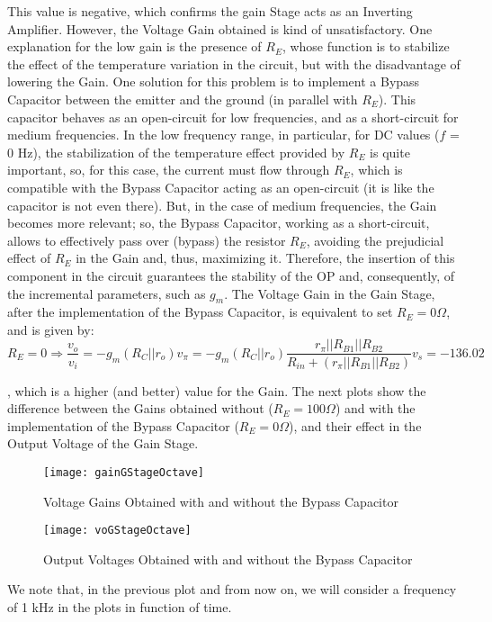 This value is negative, which confirms the gain Stage acts as an Inverting Amplifier.
However, the Voltage Gain obtained is kind of unsatisfactory. One explanation for the low gain is the presence of $R_E$, whose function is to stabilize the effect of the temperature variation in the circuit, but with the disadvantage of lowering the Gain. One solution for this problem is to implement a Bypass Capacitor between the emitter and the ground (in parallel with $R_E$). This capacitor behaves as an open-circuit for low frequencies, and as a short-circuit for medium frequencies. In the low frequency range, in particular, for DC values ($f$ = 0 Hz), the stabilization of the temperature effect provided by $R_E$ is quite important, so, for this case, the current must flow through $R_E$, which is compatible with the Bypass Capacitor acting as an open-circuit (it is like the capacitor is not even there). But, in the case of medium frequencies, the Gain becomes more relevant; so, the Bypass Capacitor, working as a short-circuit, allows to effectively pass over (bypass) the resistor $R_E$, avoiding the prejudicial effect of $R_E$ in the Gain and, thus, maximizing it. 
Therefore, the insertion of this component in the circuit guarantees the stability of the OP and, consequently, of the incremental parameters, such as $g_m$.
The Voltage Gain in the Gain Stage, after the implementation of the Bypass Capacitor, is equivalent to set $R_E = 0 \Omega$, and is given by:
\begin{equation}
	R_E = 0 \Rightarrow \frac{v_o}{v_i} = -g_m(R_C||r_o)v_{\pi} = -g_m(R_C||r_o)\frac{r_{\pi}||R_{B1}||R_{B2}}{R_{in} + (r_{\pi}||R_{B1}||R_{B2})} v_s = -136.02
	\label{eq:gainBypass}
\end{equation} 

, which is a higher (and better) value for the Gain. The next plots show the difference between the Gains obtained without ($R_E = 100 \Omega$) and with the implementation of the Bypass Capacitor ($R_E = 0 \Omega$), and their effect in the Output Voltage of the Gain Stage.

\begin{figure}[h] \centering
	\texttt{[image: gainGStageOctave]}
	\caption{Voltage Gains Obtained with and without the Bypass Capacitor}
	\label{fig:gainComp}
\end{figure} 

\begin{figure}[h] \centering
	\texttt{[image: voGStageOctave]}
	\caption{Output Voltages Obtained with and without the Bypass Capacitor}
	\label{fig:voGSComp}
\end{figure} 
We note that, in the previous plot and from now on, we will consider a frequency of 1 kHz in the plots in function of time. 

